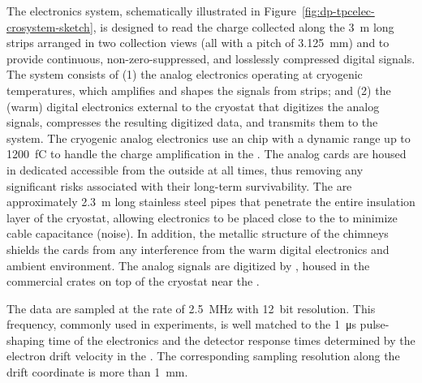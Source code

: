 The  electronics system, schematically illustrated in  Figure~\ref{fig:dp-tpcelec-crosystem-sketch}, is designed to read the charge collected along the \SI{3}{m} long  strips arranged in two collection views (all with a pitch of \SI{3.125}{mm}) and 
to provide continuous, non-zero-suppressed, and losslessly compressed digital signals.  
The system consists of (1) the  analog electronics operating at cryogenic temperatures, which amplifies and shapes the signals from  strips; and (2) the (warm) digital electronics external to the cryostat that digitizes the analog signals, compresses the resulting digitized data, and transmits them to the  system.  The cryogenic  analog electronics use an  chip with a dynamic range up to \SI{1200}{fC} to handle %
the charge amplification in the . The analog  cards are housed in dedicated  accessible from the outside at all times, thus removing any significant risks associated with their long-term survivability. The  are approximately \SI{2.3}{m} long stainless steel pipes that %
penetrate the entire insulation layer of the cryostat, allowing  electronics to be placed close to the  to minimize cable capacitance (noise).  In addition, the metallic structure of the chimneys shields the  cards from any interference from the warm digital electronics and ambient environment. The analog signals are digitized by , housed in the commercial  crates on top of the cryostat near the . 

The  data are sampled at the rate of \SI{2.5}{MHz} with \SI{12}{bit} resolution. This frequency, %
commonly used in  experiments, is well matched to the \SI{1}{\micro\second} pulse-shaping time of the  electronics and the detector response times determined by the electron drift velocity in the . The corresponding sampling resolution along the drift coordinate is more than \SI{1}{\mm}. 


